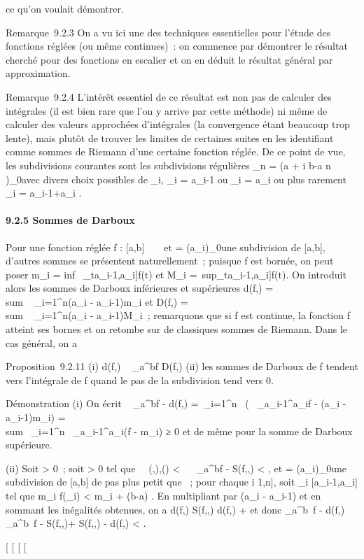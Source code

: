 \documentclass[]{article}
\begin{document}
ce qu'on voulait démontrer.

Remarque~9.2.3 On a vu ici une des techniques essentielles pour l'étude
des fonctions réglées (ou même continues)~: on commence par démontrer le
résultat cherché pour des fonctions en escalier et on en déduit le
résultat général par approximation.

Remarque~9.2.4 L'intérêt essentiel de ce résultat est non pas de
calculer des intégrales (il est bien rare que l'on y arrive par cette
méthode) ni même de calculer des valeurs approchées d'intégrales (la
convergence étant beaucoup trop lente), mais plutôt de trouver les
limites de certaines suites en les identifiant comme sommes de Riemann
d'une certaine fonction réglée. De ce point de vue, les subdivisions
courantes sont les subdivisions régulières \sigma_n = (a + i b-a
\over n )_0\leqi\leqn avec divers choix possibles de
\xi_i, \xi_i = a_i-1 ou \xi_i =
a_i ou plus rarement \xi_i =
a_i-1+a_i  .

\paragraph{9.2.5 Sommes de Darboux}

Pour une fonction réglée f : {[}a,b{]} \rightarrow~ ~ et \sigma =
(a_i)_0\leqi\leqn une subdivision de {[}a,b{]}, d'autres
sommes se présentent naturellement~; puisque f est bornée, on peut poser
m_i = inf~
_t\in{[}a_i-1,a_i{]}f(t) et M_i
=\
sup_t\in{[}a_i-1,a_i{]}f(t). On introduit alors
les sommes de Darboux inférieures et supérieures d(f,\sigma)
= \\sum ~
_i=1^n(a_i - a_i-1)m_i et
D(f,\sigma) = \\sum ~
_i=1^n(a_i - a_i-1)M_i~;
remarquons que si f est continue, la fonction f atteint ses bornes et on
retombe sur de classiques sommes de Riemann. Dans le cas général, on a

Proposition~9.2.11 (i) d(f,\sigma) \leq\int ~
_a^bf \leq D(f,\sigma) (ii) les sommes de Darboux de f tendent
vers l'intégrale de f quand le pas de la subdivision tend vers 0.

Démonstration (i) On écrit \int ~
_a^bf - d(f,\sigma) =\
\sum  _i=1^n~\left
(\int ~
_a_i-1^a_if - (a_i -
a_i-1)m_i\right )
= \\sum~
_i=1^n\int ~
_a_i-1^a_i(f - m_i) ≥ 0 et de
même pour la somme de Darboux supérieure.

(ii) Soit \epsilon \textgreater{} 0~; soit \eta \textgreater{} 0 tel que
\forall~~(\sigma,\xi),\quad \delta(\sigma) \textless{} \eta
\rigtharrow~\left \int ~
_a^bf - S(f,\sigma,\xi)\right 
\textless{} \epsilon {} , et \sigma =
(a_i)_0\leqi\leqn une subdivision de {[}a,b{]} de pas plus
petit que \eta~; pour chaque i \in {[}1,n{]}, soit \xi_i \in
{[}a_i-1,a_i{]} tel que m_i \leq f(\xi_i)
\textless{} m_i + \epsilon {}(b-a) . En
multipliant par (a_i - a_i-1) et en sommant les
inégalités obtenues, on a d(f,\sigma) \leq S(f,\sigma,\xi) \leq d(f,\sigma) + \epsilon
\over 2 et donc \left
\int  _a^b~f -
d(f,\sigma)\right \leq\left
\int  _a^b~f -
S(f,\sigma,\xi)\right  + S(f,\sigma,\xi) -
d(f,\sigma) \textless{} \epsilon.

{[}
{[}
{[}
{[}
\end{document}
